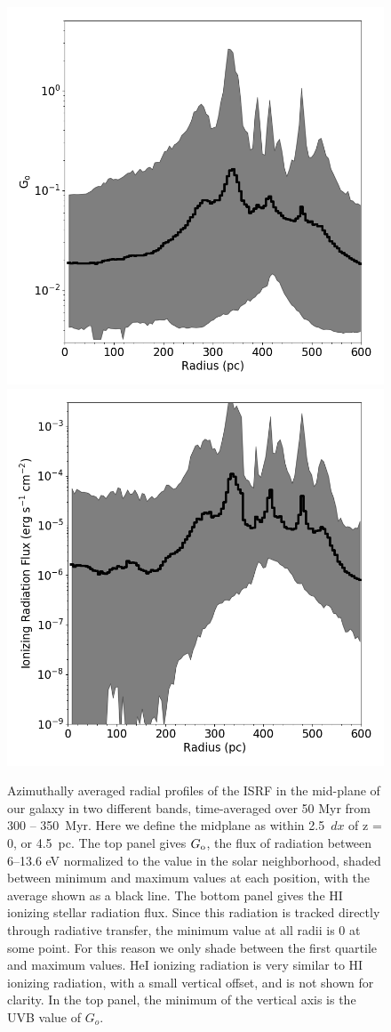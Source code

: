 \begin{figure}
\includegraphics[width=0.475\linewidth]{figures/ch1/G_o_profile}
\includegraphics[width=0.475\linewidth]{figures/ch1/ionizing_photon_profile}
\caption{
Azimuthally averaged radial profiles of the ISRF in the mid-plane of our galaxy in two different bands, time-averaged over 50 Myr from 300 -- 350~Myr. Here we define the midplane as within 2.5~$dx$ of z = 0, or 4.5~pc. The top panel gives $G_{\rm o}$, the flux of radiation between 6--13.6 eV normalized to the value in the solar neighborhood, shaded between minimum and maximum values at each position, with the average shown as a black line. The bottom panel gives the HI ionizing stellar radiation flux. Since this radiation is tracked directly through radiative transfer, the minimum value at all radii is 0 at some point. For this reason we only shade between the first quartile and maximum values. HeI ionizing radiation is very similar to HI ionizing radiation, with a small vertical offset, and is not shown for clarity. In the top panel, the minimum of the vertical axis is the UVB value of $G_o$.}
\label{ch1:fig:ISRF}
\end{figure}

